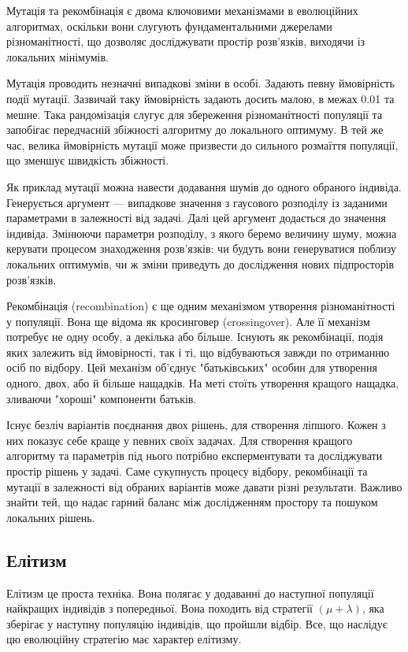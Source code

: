 Мутація та рекомбінація є двома ключовими механізмами в 
еволюційних алгоритмах, оскільки вони слугують фундаментальними 
джерелами різноманітності, що дозволяє досліджувати простір 
розв'язків, виходячи із локальних мінімумів.

Мутація проводить незначні випадкові зміни в особі.
Задають певну ймовірність події мутації.
Зазвичай таку ймовірність задають досить малою, в межах 0.01 та мешне.
Така рандомізація слугує для збереження різноманітності 
популяції та запобігає передчасній збіжності алгоритму до 
локального оптимуму. В тей же час, велика ймовірність мутації
може призвести до сильного розмаїття популяції, що зменшує
швидкість збіжності.

Як приклад мутації можна навести додавання шумів до одного
обраного індивіда. Генерується аргумент --- випадкове значення з
гаусового розподілу із заданими параметрами в залежності від задачі.
Далі цей аргумент додається до значення індивіда.
Змінюючи параметри розподілу, з якого беремо величину шуму, можна
керувати процесом знаходження розв'язків: чи будуть вони генеруватися
поблизу локальних оптимумів, чи ж зміни приведуть до дослідження нових
підпросторів розв'язків.


Рекомбінація (recombination) є ще одним механізмом утворення різноманітності у популяції.
Вона ще відома як кросинговер (crossingover).
Але її механізм потребує не одну особу, а декілька або більше.
Існують як рекомбінації, подія яких залежить від ймовірності,
так і ті, що відбуваються завжди по отриманню осіб по відбору.
Цей механізм об'єднує "батьківських" особин для
утворення одного, двох, або й більше нащадків.
На меті стоїть утворення кращого нащадка, зливаючи
"хороші" компоненти батьків.

Існує безліч варіантів поєднання двох рішень, для створення ліпшого.
Кожен з них показує себе краще у певних своїх задачах.
Для створення кращого алгоритму та параметрів під нього потрібно
експерментувати та досліджувати простір рішень у задачі.
Саме сукупнусть процесу відбору, рекомбінації та мутації
в залежності від обраних варіантів може давати різні результати.
Важливо знайти тей, що надає гарний баланс між дослідженням простору
та пошуком локальних рішень.


\subsection{Елітизм}

Елітизм це проста техніка.
Вона полягає у додаванні до наступної популяції
найкращих індивідів з попередньої. Вона походить від
стратегії $\left( \mu + \lambda \right)$, яка зберігає
у наступну популяцію індивідів, що пройшли відбір.
Все, що наслідує цю еволюційну стратегію має характер елітизму.

